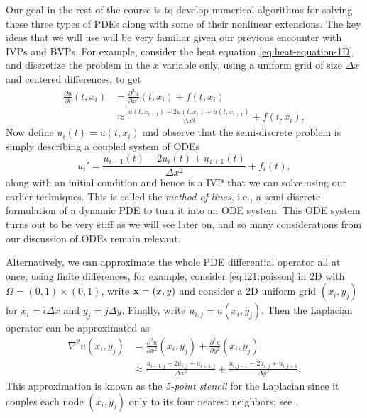 Our goal in the rest of the course is to develop numerical algorithms for 
solving these three types of PDEs along with some of their nonlinear 
extensions. The key ideas that we will use will be very familiar given 
our previous encounter with IVPs and BVPs. For example, consider the 
heat equation \eqref{eq:heat-equation-1D} and discretize the problem 
in the $x$ variable only, using a uniform grid of size $\Delta x$ and
 centered differences, to get
\begin{equation*}
 \begin{aligned}
        \frac{\partial u}{\partial t}(t, x_i) 
   & = \frac{\partial^2 u}{\partial x^2}(t, x_i) + f(t, x_i) \\ 
   & \approx \frac{u(t, x_{i-1}) - 2 u(t, x_i) + u(t, x_{i+1})}{\Delta x^2}
   + f(t, x_i), 
 \end{aligned}
\end{equation*}
Now define $u_i(t) = u(t, x_i)$ and observe that the semi-discrete problem 
is simply describing a coupled system of ODEs 
\begin{equation*}
    u_i' = \frac{u_{i-1}(t) - 2 u_{i}(t) + u_{i+1}(t)}{\Delta x^2} + f_i(t),
\end{equation*}
along with an initial condition and hence is a IVP that we can solve 
using our earlier techniques. This is called the {\it method of lines}, i.e., 
a semi-discrete formulation of a dynamic PDE to turn it into an ODE system.
This ODE system turns out to be very stiff as we will see later on, and 
so many considerations from our discussion of ODEs remain relevant. 

Alternatively, we can approximate the whole PDE differential operator 
all at once, using finite differences, for example, consider 
\eqref{eq:l21:poisson} in 2D with $\Omega = (0,1) \times (0,1)$,
 write $\mathbf{x} = (x, y)$ and consider a 2D uniform grid $(x_i, y_j)$ 
 for $x_i = i \Delta x$ and $y_j = j \Delta y$. Finally, write 
 $u_{i,j} = u(x_i, y_j)$. Then the Laplacian operator can be approximated as 
 \begin{equation*}
    \begin{aligned}
            \nabla^2 u(x_i, y_j) & = \frac{\partial^2 u}{\partial x^2}(x_i, y_j)
    + \frac{\partial^2 u}{\partial y^2}(x_i, y_j) \\
    & \approx \frac{u_{i-1, j} - 2 u_{i,j} + u_{i+1, j}}{\Delta x^2} 
    + \frac{u_{i, j-1} - 2 u_{i,j} + u_{i, j+1}}{\Delta y^2}.
    \end{aligned}
 \end{equation*}
This approximation is known as the {\it 5-point stencil} for the 
Laplacian since it couples each node $(x_i, y_j)$ only to its four 
nearest neighbors; see . 

